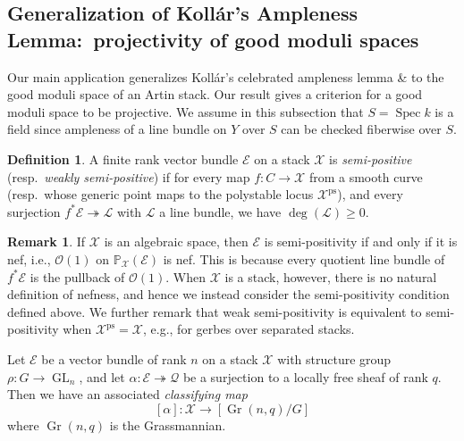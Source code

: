 \documentclass{amsart}
\theoremstyle{definition}
\newtheorem{definition}[definition]{Definition}
\newtheorem{remark}[remark]{Remark}
\newcommand{\bP}{\mathbb{P}}
\newcommand{\cX}{\mathcal{X}}
\newcommand{\cO}{\mathcal{O}}
\newcommand{\cE}{\mathcal{E}}
\newcommand{\cL}{\mathcal{L}}
\newcommand{\cQ}{\mathcal{Q}}
\DeclareMathOperator{\Gr}{Gr}
\DeclareMathOperator{\ps}{ps}
\DeclareMathOperator{\GL}{GL}
\DeclareMathOperator{\Spec}{Spec}
\begin{document}
	\subsection{Generalization of Koll\'ar's Ampleness Lemma:~projectivity of good moduli spaces}
	
	Our main application generalizes Koll\'ar's celebrated ampleness lemma \cite[Lemma 3.9]{KollarAmpleness} \& \cite[Theorem 4.5]{KovacsPatakfalvi2017} to the good moduli space of an Artin stack. Our result gives a criterion for a good moduli space to be projective. We assume in this subsection that $S = \Spec k$ is a field since ampleness of a line bundle on $Y$ over $S$ can be checked fiberwise over $S$. 
	
	
	\begin{definition}\label{def:semiposvb}
		A finite rank vector bundle $\cE$ on a stack $\cX$ is \emph{semi-positive} (resp.~\emph{weakly semi-positive}) if for every map $f\colon C\to\cX$ from a smooth curve (resp.~whose generic point maps to the polystable locus $\cX^{\ps}$), and every surjection $f^*\cE\twoheadrightarrow\cL$ with $\cL$ a line bundle, we have $\deg(\cL)\geq0$.
	\end{definition}
	
	\begin{remark}\label{rmk:semiposvbiffnef}
		If $\cX$ is an algebraic space, then $\cE$ is semi-positivity if and only if it is nef, i.e., $\cO(1)$ on $\bP_\cX(\cE)$ is nef. This is because every quotient line bundle of $f^*\cE$ is the pullback of $\cO(1)$. When $\cX$ is a stack, however, there is no natural definition of nefness, and hence we instead consider the semi-positivity condition defined above. We further remark that weak semi-positivity is equivalent to semi-positivity when $\cX^{\ps}=\cX$, e.g., for gerbes over separated stacks.
	\end{remark}
	
	
	Let $\cE$ be a vector bundle of rank $n$ on a stack $\cX$ with structure group $\rho\colon G\to\GL_n$, and let $\alpha\colon\cE \twoheadrightarrow \cQ$ be a surjection to a locally free sheaf of rank $q$. Then we have an associated \emph{classifying map}
	\[
	[\alpha]\colon\cX\to[\Gr(n,q)/G]
	\]
	where $\Gr(n,q)$ is the Grassmannian. 
	
\end{document}
